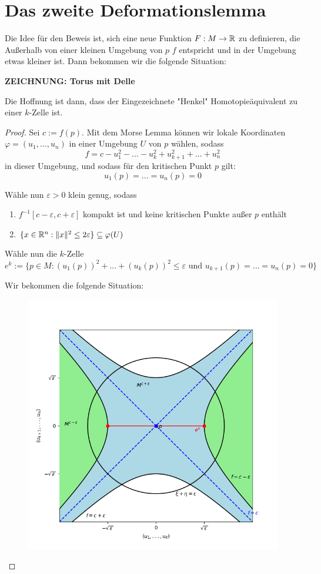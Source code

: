 \section{Das zweite Deformationslemma}

Die Idee für den Beweis ist, sich eine neue Funktion $F: M \to { \mathbb R }$ zu definieren,
die Außerhalb von einer kleinen Umgebung von $p$ $f$ entspricht und in der 
Umgebung etwas kleiner ist. Dann bekommen wir die folgende Situation:

\textbf{ZEICHNUNG: Torus mit Delle}

Die Hoffnung ist dann, dass der Eingezeichnete "Henkel" Homotopieäquivalent zu
einer $k$-Zelle ist.

\begin{proof}
    Sei $c := f(p)$. Mit dem Morse Lemma können wir lokale Koordinaten 
    $\varphi = (u_1, ..., u_n)$ in einer Umgebung $U$ von $p$ wählen, sodass
    \[ f = c - u_1^2 - ... - u_k^2 + u_{k+1}^2 + ... + u_n^2 \]
    in dieser Umgebung, und sodass für den kritischen Punkt $p$ gilt:
    \[ u_1(p) = ... = u_n(p) = 0 \]

    Wähle nun $\varepsilon > 0$ klein genug, sodass 
    \begin{enumerate}
        \item $f^{-1}[c - \varepsilon, c + \varepsilon]$ kompakt ist und keine
            kritischen Punkte außer $p$ enthält
        \item $\{ x \in { \mathbb R }^n: \lVert x \rVert^2 \leq 2 \varepsilon \} \subseteq \varphi(U) $
    \end{enumerate}

    Wähle nun die $k$-Zelle 
    \[ 
        e^k := \{ p \in M: (u_1(p))^2 + ... + (u_k(p))^2 \leq \varepsilon 
        \text{ und } u_{k+1}(p) = ... = u_n(p) = 0 \} 
    \]

    Wir bekommen die folgende Situation:

    \begin{figure}[H]
        \centering
        \includegraphics[width=0.8\linewidth]{resources/Me-Diagram6-U-parameterized.png}
        \label{fig:me-diagram6}
    \end{figure}


\end{proof}
